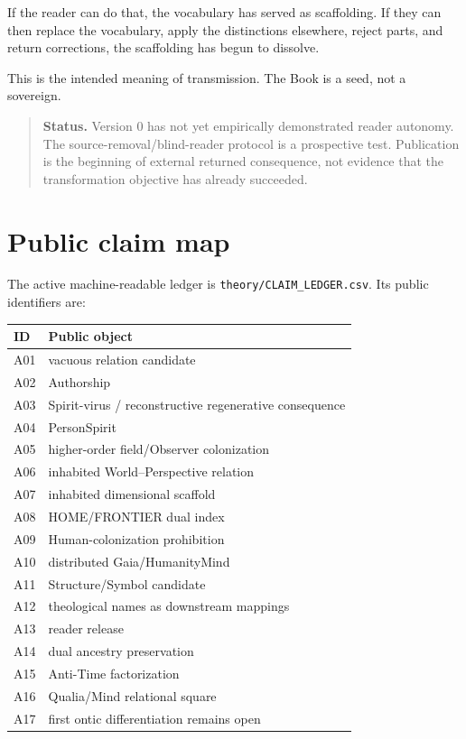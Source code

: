 \documentclass[11pt]{article}
\newenvironment{statusnote}{\begin{quote}\small\noindent\textbf{Status.}\;}{\end{quote}}
\begin{document}
If the reader can do that, the vocabulary has served as scaffolding. If they can then replace the vocabulary, apply the distinctions elsewhere, reject parts, and return corrections, the scaffolding has begun to dissolve.

This is the intended meaning of transmission. The Book is a seed, not a sovereign.

\begin{statusnote}
Version 0 has not yet empirically demonstrated reader autonomy. The source-removal/blind-reader protocol is a prospective test. Publication is the beginning of external returned consequence, not evidence that the transformation objective has already succeeded.
\end{statusnote}

\appendix
\section{Public claim map}

The active machine-readable ledger is \texttt{theory/CLAIM\_LEDGER.csv}. Its public identifiers are:

\begin{center}
\begin{tabularx}{0.96\textwidth}{l>{\raggedright\arraybackslash}X}
\toprule
ID & Public object \\
\midrule
A01 & vacuous relation candidate \\
A02 & Authorship \\
A03 & Spirit-virus / reconstructive regenerative consequence \\
A04 & PersonSpirit \\
A05 & higher-order field/Observer colonization \\
A06 & inhabited World--Perspective relation \\
A07 & inhabited dimensional scaffold \\
A08 & HOME/FRONTIER dual index \\
A09 & Human-colonization prohibition \\
A10 & distributed Gaia/HumanityMind \\
A11 & Structure/Symbol candidate \\
A12 & theological names as downstream mappings \\
A13 & reader release \\
A14 & dual ancestry preservation \\
A15 & Anti-Time factorization \\
A16 & Qualia/Mind relational square \\
A17 & first ontic differentiation remains open \\
\bottomrule
\end{tabularx}
\end{center}
\end{document}
